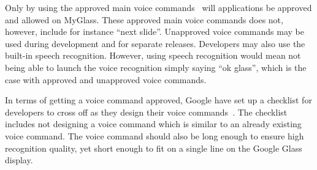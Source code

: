 Only by using the approved main voice commands~\cite{existingVoiceCommands} will applications be approved and allowed on MyGlass. These approved main voice commands does not, however, include for instance ``next slide''. Unapproved voice commands may be used during development and for separate releases. Developers may also use the built-in speech recognition. However, using speech recognition would mean not being able to launch the voice recognition simply saying ``ok glass'', which is the case with approved and unapproved voice commands.

In terms of getting a voice command approved, Google have set up a checklist for developers to cross off as they design their voice commands~\cite{glassVoiceChecklist}. The checklist includes not designing a voice command which is similar to an already existing voice command. The voice command should also be long enough to ensure high recognition quality, yet short enough to fit on a single line on the Google Glass display.